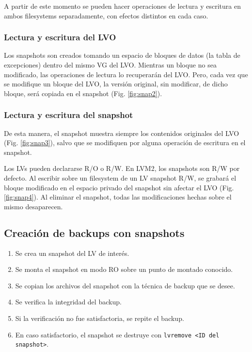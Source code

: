 
A partir de este momento se pueden hacer operaciones de lectura y escritura en ambos filesystems separadamente, con efectos distintos en cada caso. 

\subsubsection{Lectura y escritura del LVO}
\label{ssub:lvorw}
Los snapshots son creados tomando un espacio de bloques de datos (la tabla de excepciones) dentro del mismo VG del LVO. Mientras un bloque no sea modificado, las operaciones de lectura lo recuperarán del LVO. Pero, cada vez que se modifique un bloque del LVO, la versión original, sin modificar, de dicho bloque, será copiada en el snapshot (Fig. \ref{fig:snap2}). 

 
\subsubsection{Lectura y escritura del snapshot}
\label{ssub:snaprw}
De esta manera, el snapshot muestra siempre los contenidos originales del LVO (Fig. \ref{fig:snap3}), salvo que se modifiquen por alguna operación de escritura en el snapshot.


Los LVs pueden declararse R/O o R/W. En LVM2, los snapshots son R/W por defecto.  Al escribir sobre un filesystem de un LV snapshot R/W, se grabará el bloque modificado en el espacio privado del snapshot sin afectar el LVO (Fig. \ref{fig:snap4}). Al eliminar el snapshot, todas las modificaciones hechas sobre el mismo desaparecen. 




\subsection {Creación de backups con snapshots}
\begin{enumerate}
	\item Se crea un snapshot del LV de interés.
	\item Se monta el snapshot en modo RO sobre un punto de montado conocido. 
	\item Se copian los archivos del snapshot con la técnica de backup que se desee. 
	\item Se verifica la integridad del backup.
	\item Si la verificación no fue satisfactoria, se repite el backup.
	\item En caso satisfactorio, el snapshot se destruye con \lstinline$lvremove <ID del snapshot>$.  

\end{enumerate}

